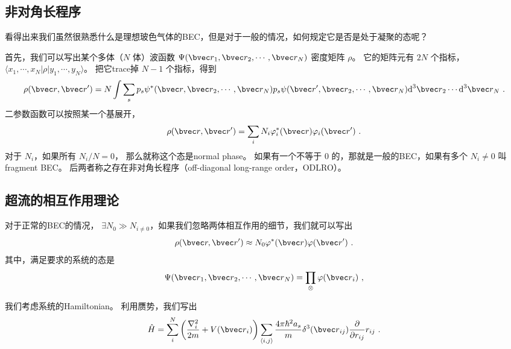\subsection{非对角长程序}
 看得出来我们虽然很熟悉什么是理想玻色气体的BEC，但是对于一般的情况，如何规定它是否是处于凝聚的态呢？

首先，我们可以写出某个多体（$N$ 体）波函数 $\Psi({\bvec r}_1,{\bvec r}_2,\cdots,{\bvec r}_N)$ 密度矩阵 $\rho$。 它的矩阵元有 $2N$ 个指标， $\langle x_1,\cdots,x_N|\rho|y_1,\cdots,y_N\rangle$。 把它trace掉 $N-1$ 个指标，得到
\begin{equation}
\rho({\bvec r},{\bvec r'}) = N\int\sum_s p_s\psi^*({\bvec r},{\bvec r}_2,\cdots,{\bvec r}_N)p_s\psi({\bvec r'},{\bvec r}_2,\cdots,{\bvec r}_N)\text{d}^3{\bvec r}_2\cdots\text{d}^3{\bvec r}_N~.
\end{equation}
二参数函数可以按照某一个基展开，
\begin{equation}
\rho({\bvec r},{\bvec r'}) = \sum_i N_i \varphi_i^*({\bvec r})\varphi_i({\bvec r'})~.
\end{equation}
对于 $N_i$，如果所有 $N_i/N=0$， 那么就称这个态是normal phase。 如果有一个不等于 $0$ 的，那就是一般的BEC，如果有多个 $N_i\neq0$ 叫 fragment BEC。 后两者称之存在非对角长程序（off-diagonal long-range order，ODLRO）。
\subsection{超流的相互作用理论}
对于正常的BEC的情况， $\exists N_0\gg N_{i\neq0}$，如果我们忽略两体相互作用的细节，我们就可以写出
\begin{equation}
\rho({\bvec r,\bvec r'}) \approx N_0\varphi^*({\bvec r})\varphi({\bvec r'})~.
\end{equation}
其中，满足要求的系统的态是
\begin{equation}\label{eq_BECSup_5}
\Psi({\bvec r}_1,{\bvec r}_2,\cdots,{\bvec r}_N) = \prod_{\otimes}\varphi({\bvec r}_i)~,
\end{equation}


我们考虑系统的Hamiltonian。 利用赝势，我们写出
\begin{equation}
\hat{H} = \sum_i^N \left(\frac{\nabla_i^2}{2m}+V({\bvec r}_i)\right)\sum_{\langle i,j\rangle}\frac{4\pi\hbar^2 a_s}{m}\delta^3({\bvec r}_{ij})\frac{\partial}{\partial r_{ij}}r_{ij}~.
\end{equation}


